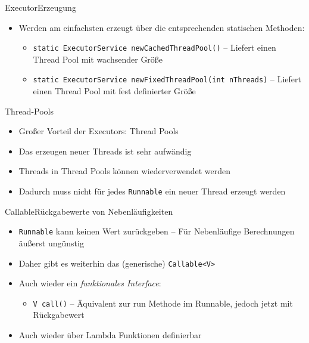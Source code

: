 \begin{frame}{Executor}{Erzeugung}
    \begin{itemize}
        \item Werden am einfachsten erzeugt über die entsprechenden statischen Methoden:
        \begin{itemize}
            \item \texttt{static ExecutorService newCachedThreadPool()} -- Liefert einen Thread Pool mit wachsender Größe
            \item \texttt{static ExecutorService newFixedThreadPool(int nThreads)} -- Liefert einen Thread Pool mit fest definierter Größe
        \end{itemize}
    \end{itemize}
\end{frame}

\begin{frame}{Thread-Pools}{}
    \begin{itemize}
        \item Großer Vorteil der Executors: Thread Pools
        \item Das erzeugen neuer Threads ist sehr aufwändig
        \item Threads in Thread Pools können wiederverwendet werden
        \item Dadurch muss nicht für jedes \texttt{Runnable} ein neuer Thread erzeugt werden
    \end{itemize}
\end{frame}

\begin{frame}{Callable}{Rückgabewerte von Nebenläufigkeiten}
    \begin{itemize}
        \item \texttt{Runnable} kann keinen Wert zurückgeben -- Für Nebenläufige Berechnungen äußerst ungünstig
        \item Daher gibt es weiterhin das (generische) \texttt{Callable<V>}
        \item Auch wieder ein \textit{funktionales Interface}:
        \begin{itemize}
            \item \texttt{V call()} -- Äquivalent zur run Methode im Runnable, jedoch jetzt mit Rückgabewert
        \end{itemize}
        \item Auch wieder über Lambda Funktionen definierbar
    \end{itemize}
\end{frame}

